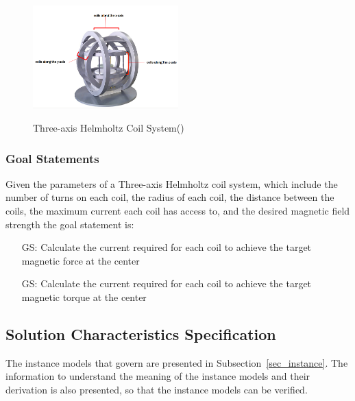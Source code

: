 \documentclass[12pt]{article}
\newcounter{goalnum} %
\begin{document}
 \begin{figure}[h!]
 \begin{center}
 {
  \includegraphics[width=0.5\textwidth]{hcs.png}
 }
 \caption{\label{helmholtz} Three-axis Helmholtz Coil System(\cite{dexingmagnet})}
 \end{center}
 \end{figure}

\subsubsection{Goal Statements}

Given the parameters of a Three-axis Helmholtz coil system, which include the number of turns on each coil, the radius of each coil, the distance between the coils, the maximum current each coil has access to, and the desired magnetic field strength the goal statement is:

\begin{itemize}

\item[GS\refstepcounter{goalnum}\thegoalnum \label{G_force}:] Calculate the current required for each coil to achieve the target magnetic force at the center
\item[GS\refstepcounter{goalnum}\thegoalnum \label{G_torque}:] Calculate the current required for each coil to achieve the target magnetic torque at the center

\end{itemize}

\subsection{Solution Characteristics Specification}


The instance models that govern \progname{} are presented in
Subsection~\ref{sec_instance}.  The information to understand the meaning of the
instance models and their derivation is also presented, so that the instance
models can be verified.
\end{document}
